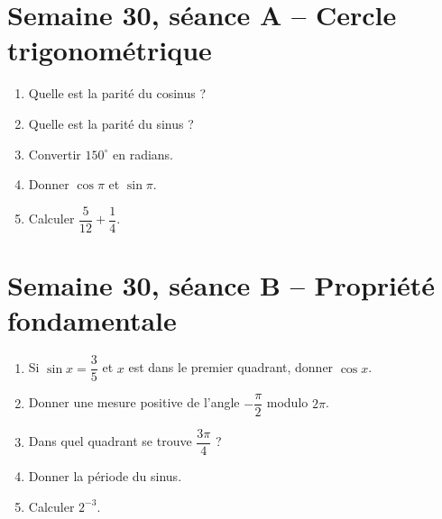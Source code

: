 \section{Semaine 30, séance A -- Cercle trigonométrique}
\begin{enumerate}
  \item Quelle est la parité du cosinus ?
  \item Quelle est la parité du sinus ?
  \item Convertir $150^\circ$ en radians.
  \item Donner $\cos\pi$ et $\sin\pi$.
  \item Calculer $\dfrac{5}{12}+\dfrac14$.
\end{enumerate}

\section{Semaine 30, séance B -- Propriété fondamentale}
\begin{enumerate}
  \item Si $\sin x=\dfrac35$ et $x$ est dans le premier quadrant, donner $\cos x$.
  \item Donner une mesure positive de l'angle $-\dfrac{\pi}{2}$ modulo $2\pi$.
  \item Dans quel quadrant se trouve $\dfrac{3\pi}{4}$ ?
  \item Donner la période du sinus.
  \item Calculer $2^{-3}$.
\end{enumerate}

